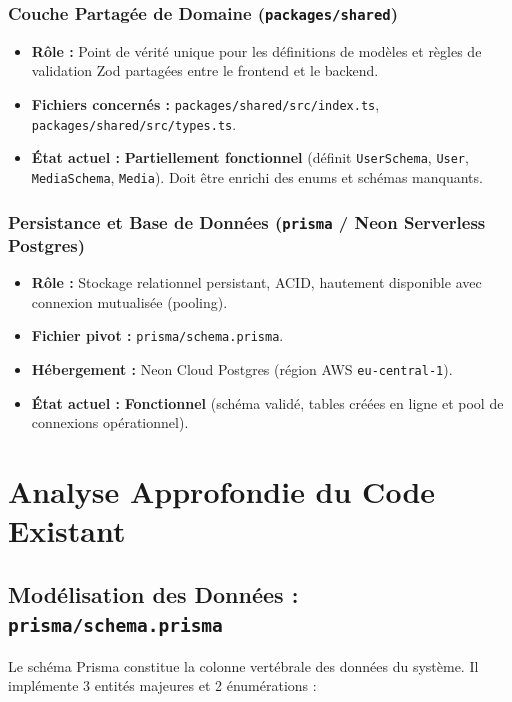 \documentclass[11pt,a4paper]{article}
\begin{document}
\subsubsection{Couche Partagée de Domaine (\texttt{packages/shared})}
\begin{itemize}
    \item \textbf{Rôle :} Point de vérité unique pour les définitions de modèles et règles de validation Zod partagées entre le frontend et le backend.
    \item \textbf{Fichiers concernés :} \texttt{packages/shared/src/index.ts}, \texttt{packages/shared/src/types.ts}.
    \item \textbf{État actuel :} \textbf{Partiellement fonctionnel} (définit \texttt{UserSchema}, \texttt{User}, \texttt{MediaSchema}, \texttt{Media}). Doit être enrichi des enums et schémas manquants.
\end{itemize}

\subsubsection{Persistance et Base de Données (\texttt{prisma} / Neon Serverless Postgres)}
\begin{itemize}
    \item \textbf{Rôle :} Stockage relationnel persistant, ACID, hautement disponible avec connexion mutualisée (pooling).
    \item \textbf{Fichier pivot :} \texttt{prisma/schema.prisma}.
    \item \textbf{Hébergement :} Neon Cloud Postgres (région AWS \texttt{eu-central-1}).
    \item \textbf{État actuel :} \textbf{Fonctionnel} (schéma validé, tables créées en ligne et pool de connexions opérationnel).
\end{itemize}

\section{Analyse Approfondie du Code Existant}

\subsection{Modélisation des Données : \texttt{prisma/schema.prisma}}
Le schéma Prisma constitue la colonne vertébrale des données du système. Il implémente 3 entités majeures et 2 énumérations :
\end{document}
